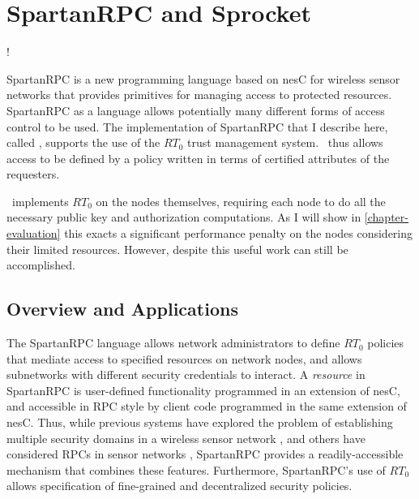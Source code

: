 
\chapter{SpartanRPC and Sprocket}
\label{chapter-spartanrpc-sprocket}

\lstset{language=nesC}
\lstMakeShortInline[basicstyle=\ttfamily]!

SpartanRPC is a new programming language based on nesC for wireless sensor networks that
provides primitives for managing access to protected resources. SpartanRPC as a language allows
potentially many different forms of access control to be used. The implementation of SpartanRPC
that I describe here, called \Sprocket \cite{sprocket}, supports the use of the $RT_0$ trust
management system. \Sprocket\ thus allows access to be defined by a policy written in terms of
certified attributes of the requesters.

\Sprocket\ implements $RT_0$ on the nodes themselves, requiring each node to do all the
necessary public key and authorization computations. As I will show in
\autoref{chapter-evaluation} this exacts a significant performance penalty on the nodes
considering their limited resources. However, despite this useful work can still be
accomplished.

\section{Overview and Applications}
\label{section-overview}

The SpartanRPC language allows network administrators to define $RT_0$ policies that mediate
access to specified resources on network nodes, and allows subnetworks with different security
credentials to interact. A \emph{resource} in SpartanRPC is user-defined functionality
programmed in an extension of nesC, and accessible in RPC style by client code programmed in the
same extension of nesC. Thus, while previous systems have explored the problem of establishing
multiple security domains in a wireless sensor network \cite{Claycomb:2011:NNL:1889383.1889450},
and others have considered RPCs in sensor networks \cite{may-tinyrpc-2007}, SpartanRPC provides
a readily-accessible mechanism that combines these features. Furthermore, SpartanRPC's use of
$RT_0$ allows specification of fine-grained and decentralized security policies.


